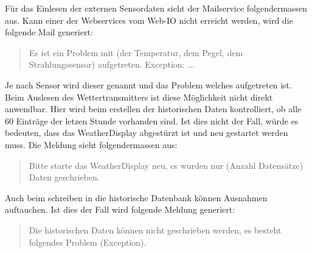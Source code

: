 Für das Einlesen der externen Sensordaten sieht der Mailservice folgendermassen aus. Kann einer der Webservices vom Web-IO nicht erreicht werden, wird die folgende Mail generiert:

\begin{quote}
Es ist ein Problem mit (der Temperatur, dem Pegel, dem Strahlungssensor) aufgetreten. Exception: ...\\
\end{quote}

Je nach Sensor wird dieser genannt und das Problem welches aufgetreten ist. Beim Auslesen des Wettertransmitters ist diese Möglichkeit nicht direkt anwendbar. Hier wird beim erstellen der historischen Daten kontrolliert, ob alle 60 Einträge der letzen Stunde vorhanden sind. Ist dies nicht der Fall, würde es bedeuten, dass das WeatherDisplay abgestürzt ist und neu gestartet werden muss. Die Meldung sieht folgendermassen aus:\\

\begin{quote}
Bitte starte das WeatherDisplay neu, es wurden nur (Anzahl Datensätze) Daten geschrieben.
\end{quote}

Auch beim schreiben in die historische Datenbank können Ausnahmen auftauchen. Ist dies der Fall wird folgende Meldung generiert:\\

\begin{quote}
Die historischen Daten können nicht geschrieben werden, es besteht folgendes Problem (Exception).
\end{quote}
